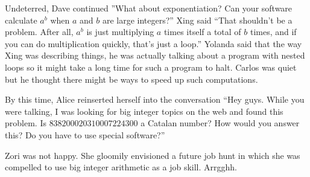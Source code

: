 Undeterred, Dave continued ''What about exponentiation?  Can your
software calculate $a^b$ when $a$ and $b$ are large integers?''
Xing said ``That shouldn't be a problem.  After all, $a^b$ is just
multiplying $a$ times itself a total of $b$ times, and if you
can do multiplication quickly, that's just a loop.''  Yolanda said
that the way Xing was describing things, he was actually
talking about a program with nested loops so it might take a long time 
for such a program to halt.  Carlos was quiet but he thought
there might be ways to speed up such computations.

By this time, Alice reinserted herself into the conversation ``Hey guys.
While you were talking, I was looking for big integer topics on the
web and found this problem.  Is $838200020310007224300$ a Catalan number?
How would you answer this?  Do you have to use special software?''

Zori was not happy.  She gloomily envisioned a future job hunt
in which she was compelled to use big integer arithmetic as a job skill.  Arrgghh.

